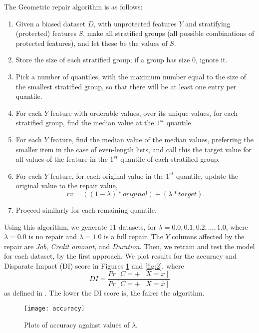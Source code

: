 \documentclass[conference]{IEEEtran}
\begin{document}
The Geometric repair algorithm is as follows:
\begin{enumerate}
    \item Given a biased dataset $D$, with unprotected features $Y$ and stratifying (protected) features $S$, make all stratified groups (all possible combinations of protected features), and let these be the values of $S$.
    \item Store the size of each stratified group; if a group has size 0, ignore it.
    \item Pick a number of quantiles, with the maximum number equal to the size of the smallest stratified group, so that there will be at least one entry per quantile. 
    \item For each $Y$ feature with orderable values, over its unique values, for each stratified group, find the median value at the $1^{st}$ quantile.
    \item For each $Y$ feature, find the median value of the median values, preferring the smaller item in the case of even-length lists, and call this the target value for all values of the feature in the $1^{st}$ quantile of each stratified group.
    \item For each $Y$ feature, for each original value in the $1^{st}$ quantile, update the original value to the repair value, $$rv = ((1 - \lambda) * original) + (\lambda * target).$$
    \item Proceed similarly for each remaining quantile.     
\end{enumerate}


Using this algorithm, we generate 11 datasets, for $\lambda = 0.0, 0.1, 0.2, \dots, 1.0$, where $\lambda = 0.0$ is no repair and $\lambda = 1.0$ is a full repair. The $Y$ columns affected by the repair are \emph{Job}, \emph{Credit amount}, and \emph{Duration}. Then, we retrain and test the model for each dataset, by the first approach. We plot results for the accuracy and Disparate Impact (DI) score in Figures \ref{fig:1} and \ref{fig:2}, where $$DI = \frac{Pr \left[ C=+ \mid X=x \right]}{Pr \left[ C=+ \mid X=\bar{x} \right]}$$ as defined in \cite{Feldman2015ComputationalFP}. The lower the DI score is, the fairer the algorithm.

\begin{figure}[ht]
    \centering
    \texttt{[image: accuracy]}
    \caption{Plots of accuracy against values of $\lambda$.}
    \label{fig:1}
\end{figure}
\end{document}

